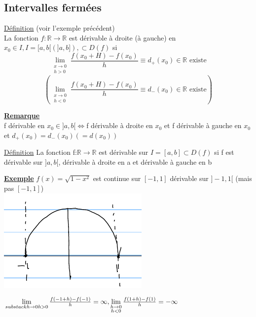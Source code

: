 \documentclass[12pt,a4paper]{article}
\newcommand{\limite}{\lim\limits_}
\newcommand{\evid}[1]{\textbf{\underline{#1}}}
\newcommand{\Xo}{\ensuremath{x_0}}
\newcommand{\R}{\ensuremath{\mathbb{R}} }
\newcommand{\rtor}{\ensuremath{\R \to \R} }
\newcommand{\Definition}{\underline{Définition} }
\begin{document}
{\subsection{Intervalles fermées}
\begin{boite}
\Definition (voir l'exemple précédent)\\
La fonction $f: \rtor$ est dérivable à droite (à gauche) en $x_0 \in I, I = [a,b[ (]a,b]), \subset D(f)$ si 
\begin{equation}
\limite{\substack{x \to 0 \\ h > 0}} \frac{f(x_0 + H) - f(x_0)}{h} \equiv d_+(x_0) \in \R\mbox{ existe}
\end{equation}
\begin{equation}
\left(\limite{\substack{x \to 0 \\ h < 0}} \frac{f(x_0 + H) - f(x_0)}{h} \equiv d_-(x_0)  \in \R\mbox{ existe}\right)
\end{equation}
\end{boite}
\begin{boite}
\evid{Remarque}\\
f dérivable en $x_0 \in ]a,b[ \iff $f dérivable à droite en $x_0$ et f dérivable à gauche en \Xo et $d_+(x_0) = d_-(x_0) (=d(x_0))$
\end{boite}
\begin{boite}
\Definition
La fonction f:\rtor est dérivable sur $I=[a,b] \subset D(f)$ si f est dérivable sur $]a,b[$, dérivable à droite en a et dérivable à gauche en b
\end{boite}
\begin{boite}
\evid{Exemple} $f(x) = \sqrt{1-x^2}$ est continue sur $[-1,1]$ dérivable sur $]-1,1[$ (mais pas $[-1,1]$)\\
\includegraphics[scale=0.5]{illustrations_Analyse/sqrtx}
\end{boite}
$\limite{substack{h \to 0 \\ h > 0}} \frac{f(-1+h) - f(-1)}{h} = \infty, \limite{\substack{h \to 0 \\ h < 0}} \frac{f(1+h) - f(1)}{h} = -\infty$
}
\end{document}
